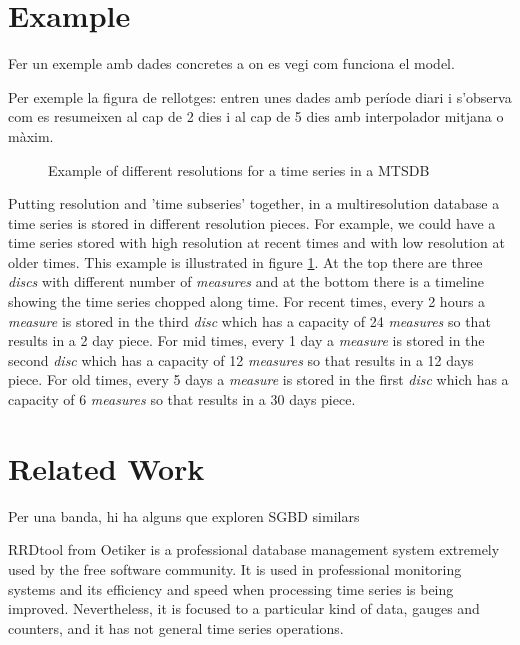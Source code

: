 \documentclass{scrartcl}
\newcommand{\imatges}{../../imatges}
\begin{document}
\section{Example}

Fer un exemple amb dades concretes a on es vegi com funciona el model.

Per exemple la figura de rellotges: entren unes dades amb període diari i s'observa com es resumeixen al cap de 2 dies i al cap de 5 dies amb interpolador mitjana o màxim.



\begin{figure}[tp]
\centering

\caption{Example of different resolutions for a time series in a MTSDB}
\label{fig:model:window}
\end{figure}


Putting resolution and 'time subseries' together, in a multiresolution database a time series is stored in different resolution pieces. For example, we could have a time series stored with high resolution at recent times and with low resolution at older times. This example is illustrated in figure \ref{fig:model:window}. At the top there are three \emph{discs} with different number of \emph{measures} and at the bottom there is a timeline showing the time series chopped along time. For recent times, every 2 hours a \emph{measure} is stored in the third \emph{disc} which has a capacity of 24 \emph{measures} so that results in a 2 day piece. For mid times, every 1 day a  \emph{measure} is stored in the second \emph{disc} which has a capacity of 12 \emph{measures} so that results in a 12 days piece. For old times, every 5 days a  \emph{measure} is stored in the first \emph{disc} which has a capacity of 6 \emph{measures} so that results in a 30 days piece. 


\section{Related Work}


Per una banda, hi ha alguns que exploren SGBD similars



RRDtool from Oetiker \cite{rrdtool} is a professional database
management system extremely used by the free software community. It is
used in professional monitoring systems and its efficiency and speed
when processing time series is being improved. Nevertheless, it is
focused to a particular kind of data, gauges and counters, and it has
not general time series operations.
\end{document}
